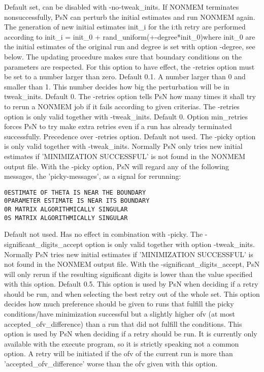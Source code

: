 \begin{optionlist}
Default set, can be disabled with -no-tweak\_inits. 
If NONMEM terminates nonsuccessfully, PsN can perturb the initial estimates and run NONMEM again. The generation of new initial estimates init\_i for the i:th retry are performed according to init\_i = init\_0 + rand\_uniform(+-degree*init\_0)where init\_0 are the initial estimates of the original run
and degree is set with option -degree, see below. 
The updating procedure makes sure that boundary conditions on the parameters are respected. 
For this option to have effect, the -retries option must be set to a number larger than zero. 
\nextopt
{}
Default 0.1. A number larger than 0 and smaller than 1. This number decides how big the perturbation will
be in tweak\_inits.
\nextopt
{}
Default 0. The -retries option tells PsN how many times it shall try to rerun a NONMEM job if it fails according to given criterias. 
The -retries option is only valid together with -tweak\_inits. 
\nextopt
{}
Default 0. Option min\_retries forces PsN to try make extra retries even if a run has already terminated successfully. Precedence over -retries option.  
\nextopt
{}
Default not used. The -picky option is only valid together with -tweak\_inits. Normally PsN only tries new initial estimates if 'MINIMIZATION SUCCESSFUL' is not found in the NONMEM output file. With the -picky option, PsN will regard any of the following messages, the 'picky-messages',  as a signal for rerunning:


\begin{verbatim}
0ESTIMATE OF THETA IS NEAR THE BOUNDARY
0PARAMETER ESTIMATE IS NEAR ITS BOUNDARY
0R MATRIX ALGORITHMICALLY SINGULAR
0S MATRIX ALGORITHMICALLY SINGULAR
\end{verbatim}
\nextopt
{}
Default not used. Has no effect in combination with -picky. The -significant\_digits\_accept option is only valid together with option -tweak\_inits. Normally PsN tries new initial estimates if 'MINIMIZATION SUCCESSFUL' is not found in the NONMEM output file. With the -significant\_digits\_accept, PsN will only rerun if the resulting significant digits is lower than the value specified with this option. 
\nextopt
{}
Default 0.5. This option is used by PsN when deciding if a retry should be run, and when selecting the best retry out of the whole set. 
This option decides how much preference should be given to runs that fulfill the picky conditions/have minimization successful 
but a slightly higher ofv (at most accepted\_ofv\_difference) than a run that did not fulfill the conditions.  
\nextopt
{}
This option is used by PsN when deciding if a retry should be run. It is currently only available with the execute program,
so it is strictly speaking not a common option.
A retry will be initiated if the ofv of the current run is more than 'accepted\_ofv\_difference' worse than the ofv
given with this option.
\nextopt
\end{optionlist}

